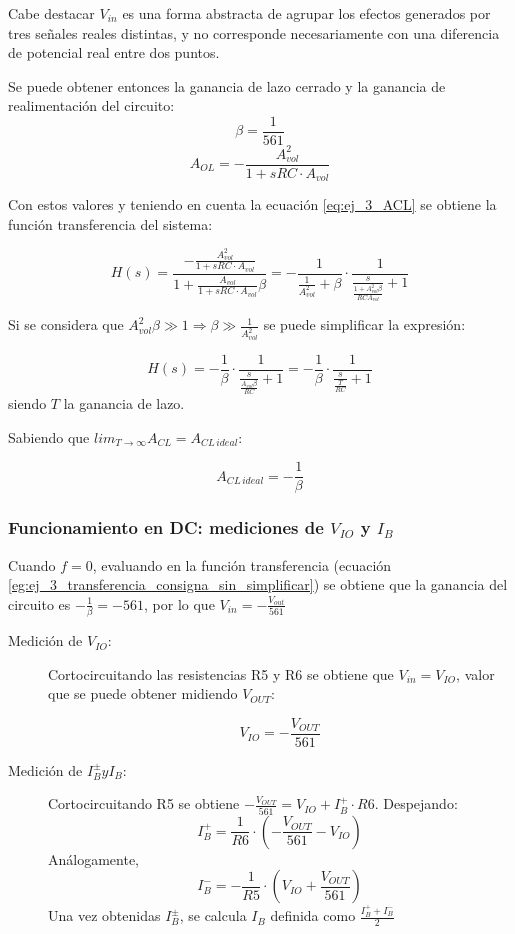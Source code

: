 \documentclass[../../main.tex]{subfiles}
\begin{document}
Cabe destacar $V_{in}$ es una forma abstracta de agrupar los efectos generados por tres se\~nales reales distintas, y no corresponde necesariamente con una diferencia de potencial real entre dos puntos.

 Se puede obtener entonces la ganancia de lazo cerrado y la ganancia de realimentaci\'on del circuito:
\[\beta = \frac{1}{561}\]
\[A_{OL} = -\frac{A_{vol}^2}{1+sRC\cdot A_{vol}}\]

Con estos valores y teniendo en cuenta la ecuaci\'on \ref{eq:ej_3_ACL} se obtiene la funci\'on transferencia del sistema:

\begin{equation}
	H(s)=\frac{-\frac{A_{vol}^2}{1+sRC\cdot A_{vol}}}{1+\frac{A_{vol}}{1+sRC\cdot A_{vol}}\beta}
	=-\frac{1}{\frac{1}{A_{vol}^2}+\beta}\cdot \frac{1}{\frac{s}{\frac{1+A_{vol}^2\beta}{RCA_{vol}}} +1}
	\label{eg:ej_3_transferencia_consigna_sin_simplificar}
\end{equation}


Si se considera que $A_{vol}^2\beta \gg 1 \Rightarrow \beta \gg \frac{1}{A_{vol}^2}$ se puede simplificar la expresi\'on:


\begin{equation}
	H(s) = -\frac{1}{\beta}\cdot \frac{1}{\frac{s}{\frac{A_{vol}\beta}{RC}}+1}=-\frac{1}{\beta}\cdot \frac{1}{\frac{s}{\frac{T}{RC}}+1}
	\label{eq:ej_3_transferencia_consigna_simplificada}
\end{equation}
siendo $T$ la ganancia de lazo.

Sabiendo que $lim_{T\rightarrow \infty}A_{CL} = A_{CL\,ideal}$:

\begin{equation}
	A_{CL\,ideal} = -\frac{1}{\beta}
\end{equation}


\subsubsection{Funcionamiento en DC: mediciones de $V_{IO}$ y $I_B$}

Cuando $f=0$, evaluando en la funci\'on transferencia (ecuaci\'on \ref{eg:ej_3_transferencia_consigna_sin_simplificar}) se obtiene que la ganancia del circuito es $-\frac{1}{\beta}=-561$, por lo que $V_{in}=-\frac{V_{out}}{561}$


\begin{description}
	\item[Medici\'on de $V_{IO}$:] Cortocircuitando las resistencias R5 y R6 se obtiene que $V_{in} = V_{IO}$, valor que se puede obtener midiendo $V_{OUT}$:
	
	\[V_{IO} = -\frac{V_{OUT}}{561}\]
	\item[Medici\'on de $I_B^\pm y I_B$:] Cortocircuitando R5 se obtiene $-\frac{V_{OUT}}{561} = V_{IO} + I_B^+\cdot R6$. Despejando:
	\[I_B^+=\frac{1}{R6}\cdot\left( -\frac{V_{OUT}}{561}-V_{IO}  \right) \]
	An\'alogamente,
	\[I_B^-=-\frac{1}{R5}\cdot \left( V_{IO} + \frac{V_{OUT}}{561}   \right)\]
	Una vez obtenidas $I_B^\pm$, se calcula $I_B$ definida como $\frac{I_B^++I_B^-}{2}$
\end{description}
\end{document}
